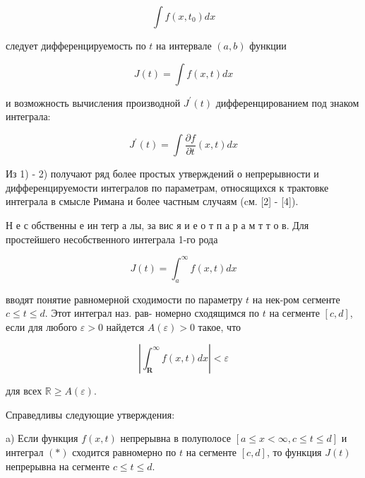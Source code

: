 \documentclass[10pt]{article}
\begin{document}
\[

\int f\left(x, t_{0}\right) d x

\]



следует дифференцируемость по $t$ на интервале $(a, b)$ функции



\[

J(t)=\int f(x, t) d x

\]



и возможность вычисления производной $J^{\prime}(t)$ дифференцированием под знаком интеграла:



\[

J^{\prime}(t)=\int \frac{\partial f}{\partial t}(x, t) d x

\]



Из 1) - 2) получают ряд более простых утверждений о непрерывности и дифференцируемости интегралов по параметрам, относящихся к трактовке интеграла в смысле Римана и более частным случаям (cм. [2] - [4]).



Н е с обственны е ин тегр а лы, за вис я и е о т п а р а м т т о в. Для простейшего несобственного интеграла 1-го рода



\[

J(t)=\int_{a}^{\infty} f(x, t) d x

\]



вводят понятие равномерной сходимости по параметру $t$ на нек-ром сегменте $c \leqslant t \leqslant d$. Этот интеграл наз. рав- номерно сходящимся по $t$ на сегменте $[c, d]$, если для любого $\varepsilon>0$ найдется $A(\varepsilon)>0$ такое, что



\[

\left|\int_{\boldsymbol{R}}^{\infty} f(x, t) d x\right|<\varepsilon

\]



для всех $\mathbb{R} \geqslant A(\varepsilon)$.



Справедливы следующие утверждения:



a) Если функция $f(x, t)$ непрерывна в полуполосе $[a \leqslant x<\infty, c \leqslant t \leqslant d]$ и интеграл $(*)$ сходится равномерно по $t$ на сегменте $[c, d]$, то функция $J(t)$ непрерывна на сегменте $c \leqslant t \leqslant d$.
\end{document}
